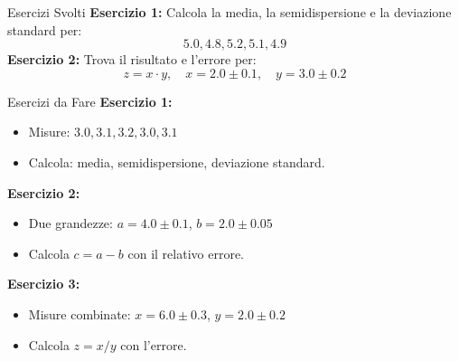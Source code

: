 \documentclass[9pt]{beamer}
\begin{document}
\begin{frame}{Esercizi Svolti}
\textbf{Esercizio 1:} Calcola la media, la semidispersione e la deviazione standard per:
$$
5.0, 4.8, 5.2, 5.1, 4.9
$$
\textbf{Esercizio 2:} Trova il risultato e l’errore per:
$$
z = x \cdot y, \quad x = 2.0 \pm 0.1, \quad y = 3.0 \pm 0.2
$$
\end{frame}

\begin{frame}{Esercizi da Fare}
\textbf{Esercizio 1:}
\begin{itemize}
    \item Misure: $ 3.0, 3.1, 3.2, 3.0, 3.1 $
    \item Calcola: media, semidispersione, deviazione standard.
\end{itemize}
\textbf{Esercizio 2:}
\begin{itemize}
    \item Due grandezze: $ a = 4.0 \pm 0.1 $, $ b = 2.0 \pm 0.05 $
    \item Calcola $ c = a - b $ con il relativo errore.
\end{itemize}
\textbf{Esercizio 3:}
\begin{itemize}
    \item Misure combinate: $ x = 6.0 \pm 0.3 $, $ y = 2.0 \pm 0.2 $
    \item Calcola $ z = x / y $ con l’errore.
\end{itemize}
\end{frame}
\end{document}
